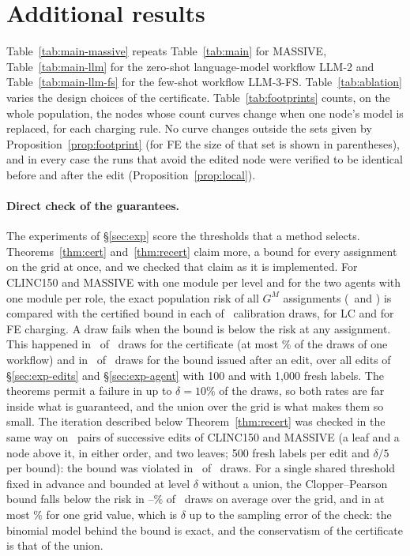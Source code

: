 \section{Additional results}\label{app:more}

Table~\ref{tab:main-massive} repeats Table~\ref{tab:main} for MASSIVE,
Table~\ref{tab:main-llm} for the zero-shot language-model workflow LLM-2 and
Table~\ref{tab:main-llm-fs} for the few-shot workflow LLM-3-FS.
Table~\ref{tab:ablation} varies the design choices of the certificate.
Table~\ref{tab:footprints} counts, on the whole population, the nodes whose count curves
change when one node's model is replaced, for each charging rule. No curve changes outside
the sets given by Proposition~\ref{prop:footprint} (for FE the size of that set is shown in
parentheses), and in every case the runs that avoid the edited node were verified to be
identical before and after the edit (Proposition~\ref{prop:local}).

\paragraph{Direct check of the guarantees.} The experiments of \S\ref{sec:exp} score the
thresholds that a method selects. Theorems~\ref{thm:cert} and~\ref{thm:recert} claim more, a
bound for every assignment on the grid at once, and we checked that claim as it is
implemented. For CLINC150 and MASSIVE with one module per level and for the two agents with
one module per role, the exact population risk of all $G^M$ assignments
(\CoverageAssignMin\ and \CoverageAssignMax) is compared with the certified bound in each of
\CoverageDraws\ calibration draws, for LC and for FE charging. A draw fails when the bound is
below the risk at any assignment. This happened in \CoverageCertViolations\ of
\CoverageCertDraws\ draws for the certificate (at most \CoverageCertWorst\% of the draws of
one workflow) and in \CoverageRecertViolations\ of \CoverageRecertDraws\ draws for the bound
issued after an edit, over all edits of \S\ref{sec:exp-edits} and \S\ref{sec:exp-agent} with
100 and with 1{,}000 fresh labels. The theorems permit a failure in up to $\delta=10\%$ of
the draws, so both rates are far inside what is guaranteed, and the union over the grid is
what makes them so small. The iteration described below Theorem~\ref{thm:recert} was checked
in the same way on \CoverageTwoConfigs\ pairs of successive edits of CLINC150 and MASSIVE (a
leaf and a node above it, in either order, and two leaves; 500 fresh labels per edit and
$\delta/5$ per bound): the bound was violated in \CoverageTwoViolations\ of
\CoverageTwoDraws\ draws. For a single shared threshold fixed in advance and bounded
at level $\delta$ without a union, the Clopper--Pearson bound falls below the risk in
\CoverageSingleMeanLow--\CoverageSingleMeanHigh\% of \CoverageSingleDraws\ draws on average
over the grid, and in at most \CoverageSingleLargest\% for one grid value, which is $\delta$
up to the sampling error of the check: the binomial model behind the bound is exact, and the
conservatism of the certificate is that of the union.

